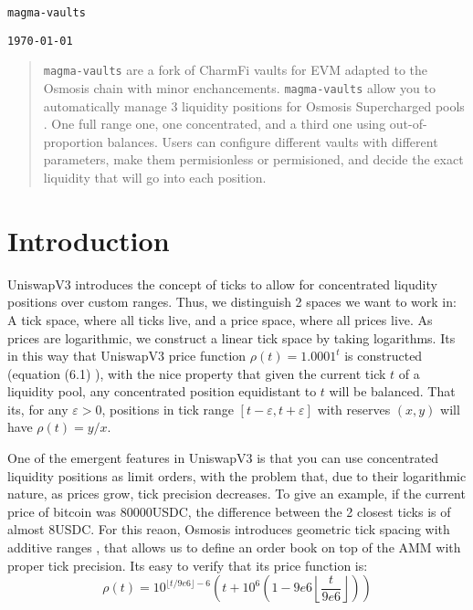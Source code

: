 \documentclass[11pt]{article}
\begin{document}
\begin{center}
\texttt{\Large magma-vaults}

\vspace{0.5em} %
\texttt{\large \today}
\end{center}

\begin{abstract}
    \texttt{magma-vaults} are a fork of CharmFi vaults for EVM
    \cite{charmfi-doc} adapted to the Osmosis chain with minor enchancements.
    \texttt{magma-vaults} allow you to automatically manage 3 liquidity
    positions for Osmosis Supercharged pools \cite{osmosis-supercharged-doc}.
    One full range one, one concentrated, and a third one using
    out-of-proportion balances. Users can configure different vaults with
    different parameters, make them permisionless or permisioned, and decide
    the exact liquidity that will go into each position.
\end{abstract}

\section{Introduction}
UniswapV3 introduces the concept of ticks to allow for concentrated liqudity
positions over custom ranges. Thus, we distinguish 2 spaces we want to work in:
A tick space, where all ticks live, and a price space, where all prices live. As
prices are logarithmic, we construct a linear tick space by taking logarithms.
Its in this way that UniswapV3 price function $\rho(t) = 1.0001^t$ is constructed
(equation (6.1) \citep{uniswapv3}), with the nice property that given the current
tick $t$ of a liquidity pool, any concentrated position equidistant to $t$ will
be balanced. That its, for any $\varepsilon > 0$, positions in tick range
$[t-\varepsilon, t + \varepsilon]$ with reserves $(x, y)$ will have $\rho(t) =
y/x$.

One of the emergent features in UniswapV3 is that you can use concentrated
liquidity positions as limit orders, with the problem that, due to their
logarithmic nature, as prices grow, tick precision decreases. To give
an example, if the current price of bitcoin was 80000USDC, the difference
between the 2 closest ticks is of almost 8USDC. For this reaon, Osmosis introduces
geometric tick spacing with additive ranges \cite{osmosis-price-function}, that
allows us to define an order book on top of the AMM with proper tick precision.
Its easy to verify that its price function is:
\[
\rho(t) = 10^{\lfloor t/9e6\rfloor - 6} \left(
	t+10^6\left(1 - 9e6\left\lfloor \frac t{9e6}\right\rfloor
	\right)
\right)
\]
\end{document}
